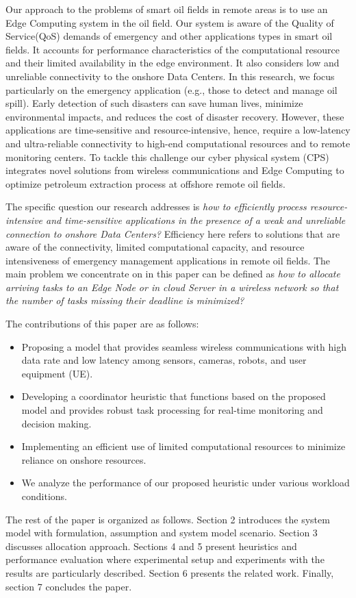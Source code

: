 Our approach to the problems of smart oil fields in remote areas is to use an Edge Computing system in the oil field. Our system is aware of the Quality of Service(QoS) demands of emergency and other applications types in smart oil fields. It accounts for performance characteristics of the computational resource and their limited availability in the edge environment. It also considers low and unreliable connectivity to the onshore Data Centers. In this research, we focus particularly on the emergency application (e.g., those to detect and manage oil spill). Early detection of such disasters can save human lives, minimize environmental impacts, and reduces the cost of disaster recovery. However, these applications are time-sensitive and resource-intensive, hence, require a low-latency and ultra-reliable connectivity to high-end computational resources and to remote monitoring centers. To tackle this challenge our cyber physical system (CPS) integrates novel solutions from wireless communications and Edge Computing to optimize petroleum extraction process at offshore remote oil fields. 

The specific question our research addresses is \emph{how to efficiently process resource-intensive and time-sensitive applications in the presence of a weak and unreliable connection to onshore Data Centers?} Efficiency here refers to solutions that are aware of the connectivity, limited computational capacity, and resource intensiveness of emergency management applications in remote oil fields. The main problem we concentrate on in this paper can be defined as \textit{how to allocate arriving tasks to an Edge Node or in cloud Server in a wireless network so that the number of tasks missing their deadline is minimized?} 

The contributions of this paper are as follows:

\begin{itemize}
    \item Proposing a model that provides seamless wireless communications with high data rate and low latency among sensors, cameras, robots, and user equipment (UE).
    \item Developing a coordinator heuristic that functions based on the proposed model and provides robust task processing for real-time monitoring and decision making.
    \item Implementing an efficient use of limited computational resources to minimize reliance on onshore resources.
    \item We analyze the performance of our proposed heuristic under various workload conditions.
\end{itemize}

The rest of the paper is organized as follows. Section 2 introduces the system model with formulation, assumption and system model scenario. Section 3 discusses allocation approach. Sections 4 and 5 present heuristics and performance evaluation where experimental setup and experiments with the results are particularly described. Section 6 presents the related work. Finally, section 7 concludes the paper.






